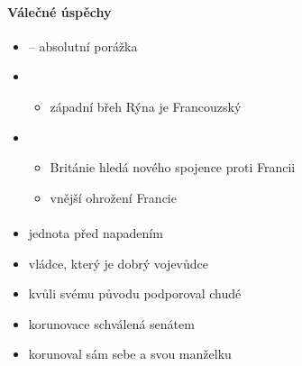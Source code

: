 \paragraph{Válečné úspěchy}
\begin{itemize}
\item {} -- absolutní porážka
\item {}
	\begin{itemize}
	\item západní břeh Rýna je Francouzský
	\end{itemize}
\item {}
	\begin{itemize}
	\item Británie hledá nového spojence proti Francii
	\item[\ra] vnější ohrožení Francie
	\end{itemize}
\end{itemize}

\paragraph{}
\begin{itemize}
\item jednota před napadením
\item vládce, který je dobrý vojevůdce
\item kvůli svému původu podporoval chudé
\item korunovace schválená senátem
\item korunoval sám sebe a svou manželku
\end{itemize}


